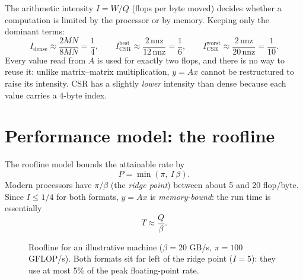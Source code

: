 \documentclass[11pt,a4paper]{article}
\newcommand{\nnz}{\mathrm{nnz}}
\begin{document}
The arithmetic intensity $I = W / Q$ (flops per byte moved) decides whether a
computation is limited by the processor or by memory. Keeping only the
dominant terms:
\[
  I_{\text{dense}} \approx \frac{2MN}{8MN} = \frac{1}{4}, \qquad
  I_{\text{CSR}}^{\text{best}} \approx \frac{2\,\nnz}{12\,\nnz} = \frac{1}{6}, \qquad
  I_{\text{CSR}}^{\text{worst}} \approx \frac{2\,\nnz}{20\,\nnz} = \frac{1}{10}.
\]
Every value read from $A$ is used for exactly two flops, and there is no way
to reuse it: unlike matrix--matrix multiplication, $y = Ax$ cannot be
restructured to raise its intensity. CSR has a slightly \emph{lower} intensity
than dense because each value carries a 4-byte index.

\section{Performance model: the roofline}

The roofline model bounds the attainable rate by
\[
  P = \min(\pi,\ I\,\beta).
\]
Modern processors have $\pi / \beta$ (the \emph{ridge point}) between about 5
and 20 flop/byte. Since $I \le 1/4$ for both formats, $y = Ax$ is
\emph{memory-bound}: the run time is essentially
\[
  T \approx \frac{Q}{\beta}.
\]

\begin{figure}[H]
\centering
{}
\caption{Roofline for an illustrative machine ($\beta = 20$ GB/s,
$\pi = 100$ GFLOP/s). Both formats sit far left of the ridge point
($I = 5$): they use at most 5\% of the peak floating-point rate.}
\label{fig:roofline}
\end{figure}
\end{document}
